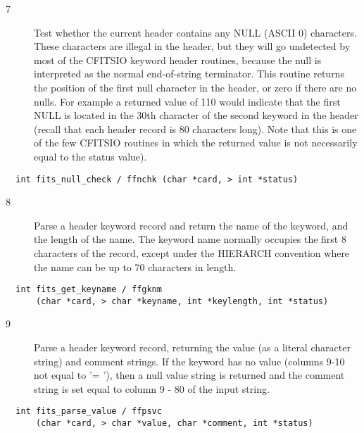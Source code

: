 \documentclass[11pt]{book}
\begin{document}
\begin{description}
\item[7 ] Test whether the current header contains any NULL (ASCII 0) characters.
    These characters are illegal in the header, but they will go undetected
    by most of the CFITSIO keyword header routines, because the null is
    interpreted as the normal end-of-string terminator.  This routine returns
    the position of the first null character in the header, or zero if there
    are no nulls.  For example a returned value of 110 would indicate that
    the first NULL is located in the 30th character of the second keyword
    in the header (recall that each header record is 80 characters long).
    Note that this is one of the few CFITSIO routines in which the returned
    value is not necessarily equal to the status value).   \label{ffnchk}
\end{description}

\begin{verbatim}
  int fits_null_check / ffnchk (char *card, > int *status)
\end{verbatim}

\begin{description}
\item[8 ] Parse a header keyword record and return the name of the keyword,
    and the length of the name.
    The keyword name normally occupies the first 8 characters of the
    record, except under the HIERARCH convention where the name can
   be up to 70 characters in length. \label{ffgknm}
\end{description}

\begin{verbatim}
  int fits_get_keyname / ffgknm
      (char *card, > char *keyname, int *keylength, int *status)
\end{verbatim}

\begin{description}
\item[9 ] Parse a header keyword record, returning the value (as
    a literal character string) and comment strings.  If the keyword has no
    value (columns 9-10 not equal to '= '), then a null value string is
    returned and the comment string is set equal to column 9 - 80 of the
   input string. \label{ffpsvc}
\end{description}

\begin{verbatim}
  int fits_parse_value / ffpsvc
      (char *card, > char *value, char *comment, int *status)
\end{verbatim}
\end{document}
